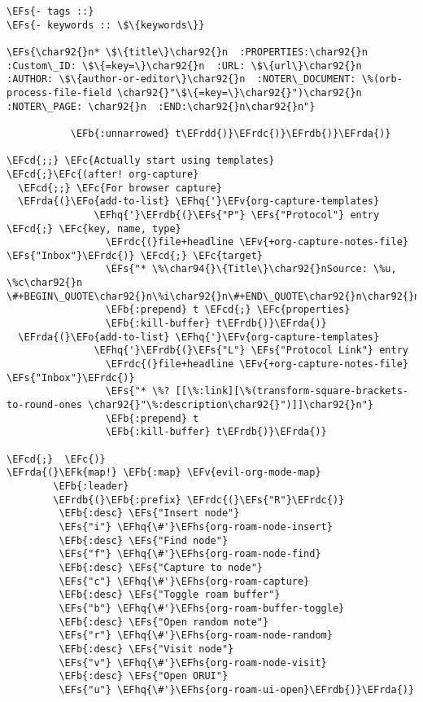 \documentclass[a4wide,10pt]{article}
\newcommand{\EFc}[1]{\textcolor{EFc}{#1}} %
\newcommand{\EFcd}[1]{\textcolor{EFcd}{#1}} %
\newcommand{\EFs}[1]{\textcolor{EFs}{#1}} %
\newcommand{\EFk}[1]{\textcolor{EFk}{#1}} %
\newcommand{\EFb}[1]{\textcolor{EFb}{#1}} %
\newcommand{\EFv}[1]{\textcolor{EFv}{#1}} %
\newcommand{\EFo}[1]{\textcolor{EFo}{#1}} %
\newcommand{\EFhq}[1]{\textcolor{EFhq}{#1}} %
\newcommand{\EFhs}[1]{\textcolor{EFhs}{#1}} %
\newcommand{\EFrda}[1]{\textcolor{EFrda}{#1}} %
\newcommand{\EFrdb}[1]{\textcolor{EFrdb}{#1}} %
\newcommand{\EFrdc}[1]{\textcolor{EFrdc}{#1}} %
\newcommand{\EFrdd}[1]{\textcolor{EFrdd}{#1}} %
\begin{document}
\begin{Code}
\begin{Verbatim}
\EFs{- tags ::}
\EFs{- keywords :: \$\{keywords\}}

\EFs{\char92{}n* \$\{title\}\char92{}n  :PROPERTIES:\char92{}n  :Custom\_ID: \$\{=key=\}\char92{}n  :URL: \$\{url\}\char92{}n  :AUTHOR: \$\{author-or-editor\}\char92{}n  :NOTER\_DOCUMENT: \%(orb-process-file-field \char92{}"\$\{=key=\}\char92{}")\char92{}n  :NOTER\_PAGE: \char92{}n  :END:\char92{}n\char92{}n"}

           \EFb{:unnarrowed} t\EFrdd{)}\EFrdc{)}\EFrdb{)}\EFrda{)}

\EFcd{;;} \EFc{Actually start using templates}
\EFcd{;}\EFc{(after! org-capture}
  \EFcd{;;} \EFc{For browser capture}
  \EFrda{(}\EFo{add-to-list} \EFhq{'}\EFv{org-capture-templates}
               \EFhq{'}\EFrdb{(}\EFs{"P"} \EFs{"Protocol"} entry \EFcd{;} \EFc{key, name, type}
                 \EFrdc{(}file+headline \EFv{+org-capture-notes-file} \EFs{"Inbox"}\EFrdc{)} \EFcd{;} \EFc{target}
                 \EFs{"* \%\char94{}\{Title\}\char92{}nSource: \%u, \%c\char92{}n \#+BEGIN\_QUOTE\char92{}n\%i\char92{}n\#+END\_QUOTE\char92{}n\char92{}n\char92{}n\%?"}
                 \EFb{:prepend} t \EFcd{;} \EFc{properties}
                 \EFb{:kill-buffer} t\EFrdb{)}\EFrda{)}
  \EFrda{(}\EFo{add-to-list} \EFhq{'}\EFv{org-capture-templates}
               \EFhq{'}\EFrdb{(}\EFs{"L"} \EFs{"Protocol Link"} entry
                 \EFrdc{(}file+headline \EFv{+org-capture-notes-file} \EFs{"Inbox"}\EFrdc{)}
                 \EFs{"* \%? [[\%:link][\%(transform-square-brackets-to-round-ones \char92{}"\%:description\char92{}")]]\char92{}n"}
                 \EFb{:prepend} t
                 \EFb{:kill-buffer} t\EFrdb{)}\EFrda{)}

\EFcd{;}  \EFc{)}
\EFrda{(}\EFk{map!} \EFb{:map} \EFv{evil-org-mode-map}
        \EFb{:leader}
        \EFrdb{(}\EFb{:prefix} \EFrdc{(}\EFs{"R"}\EFrdc{)}
         \EFb{:desc} \EFs{"Insert node"}
         \EFs{"i"} \EFhq{\#'}\EFhs{org-roam-node-insert}
         \EFb{:desc} \EFs{"Find node"}
         \EFs{"f"} \EFhq{\#'}\EFhs{org-roam-node-find}
         \EFb{:desc} \EFs{"Capture to node"}
         \EFs{"c"} \EFhq{\#'}\EFhs{org-roam-capture}
         \EFb{:desc} \EFs{"Toggle roam buffer"}
         \EFs{"b"} \EFhq{\#'}\EFhs{org-roam-buffer-toggle}
         \EFb{:desc} \EFs{"Open random note"}
         \EFs{"r"} \EFhq{\#'}\EFhs{org-roam-node-random}
         \EFb{:desc} \EFs{"Visit node"}
         \EFs{"v"} \EFhq{\#'}\EFhs{org-roam-node-visit}
         \EFb{:desc} \EFs{"Open ORUI"}
         \EFs{"u"} \EFhq{\#'}\EFhs{org-roam-ui-open}\EFrdb{)}\EFrda{)}


\end{Verbatim}
\end{Code}
\end{document}
